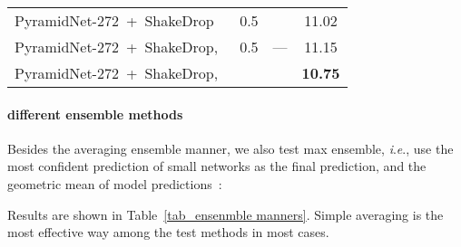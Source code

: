 \documentclass[lettersize,journal]{IEEEtran}
\newcommand{\ie}{\textit{i}.\textit{e}.}
\begin{document}
\begin{table}[tbp]
{\begin{tabular}{llcc}
			\midrule
			
			PyramidNet-272~+~ShakeDrop
			& 0.5
			& \multirow{3}{*}{---} & 11.02
			\\
			
			PyramidNet-272~+~ShakeDrop,~
			& 0.5
			& & 11.15	
			\\	
			
			PyramidNet-272~+~ShakeDrop,~
			& 
			& & \textbf{10.75}	
			\\			
			\bottomrule	
	\end{tabular} }
\end{table}
 
\paragraph{different ensemble methods}
Besides the averaging ensemble manner,
we also test max ensemble,
\ie, use the most confident prediction of small networks as the final prediction,
and the geometric mean of model predictions~\cite{kondratyukWhenEnsemblingSmaller2020}:

Results are shown in Table~\ref{tab_ensenmble manners}.
Simple averaging is the most effective way among the test methods in most cases.
\end{document}
